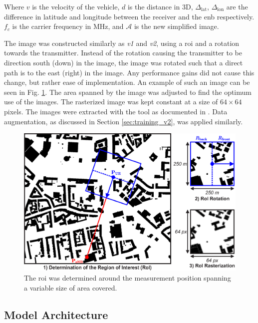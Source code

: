 Where $v$ is the velocity of the vehicle, $d$ is the distance in $3$D, $\Delta_\text{lat}$, $\Delta_\text{lon}$ are the difference in latitude and longitude between the receiver and the \gls{enb} respectively. $f_c$ is the carrier frequency in MHz, and $\mathcal{A}$ is the new simplified image.

The image was constructed similarly as \emph{v1} and \emph{v2}, using a \gls{roi} and a rotation towards the transmitter. Instead of the rotation causing the transmitter to be direction south (down) in the image, the image was rotated such that a direct path is to the east (right) in the image. Any performance gains did not cause this change, but rather ease of implementation. An example of such an image can be seen in Fig. \ref{fig:roi_image_preperation}. The area spanned by the image was adjusted to find the optimum use of the images. The rasterized image was kept constant at a size of $64 \times 64$ pixels. The images were extracted with the tool as documented in \cite{SliwaLightweightNetworks}. Data augmentation, as discussed in Section \ref{sec:training_v2}, was applied similarly.


\begin{figure}
    \centering
    \includegraphics{chapters/part_pathloss/osm_images_paper/figures/map_to_image.eps}
    \caption{The \gls{roi} was determined around the measurement position spanning a variable size of area covered.}
    \label{fig:roi_image_preperation}
\end{figure}

\subsection{Model Architecture}


